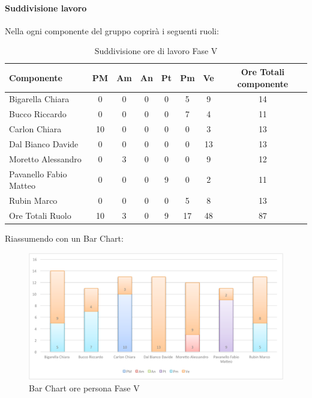 			\paragraph{Suddivisione lavoro}
				Nella  ogni componente del gruppo \groupname{} coprirà i seguenti ruoli:
				\begin{table}[H]
					\begin{center}
						\begin{tabular}{| l | c | c | c | c | c | c | c |}
							\hline
							Componente 				& PM	& Am 	& An 	& Pt 		& Pm 	& Ve 	& Ore Totali componente \\ \hline
							
							Bigarella Chiara 			& 0		& 0		& 0		& 0		& 5 		& 9 		& 14 \\
							Bucco Riccardo 			& 0		& 0		& 0		& 0		& 7		& 4 		& 11 \\
							Carlon Chiara	 			& 10 		& 0		& 0		& 0		& 0		& 3 		& 13 \\
							Dal Bianco Davide 			& 0		& 0		& 0		& 0		& 0		& 13 		& 13 \\
							Moretto Alessandro 			& 0		& 3 		& 0		& 0		& 0		& 9 		& 12 \\
							Pavanello Fabio Matteo	 	& 0		& 0		& 0		& 9 		& 0		& 2 		& 11 \\
							Rubin Marco				& 0		& 0		& 0		& 0		& 5 		& 8 		& 13 \\ \hline \hline
							
							Ore Totali Ruolo 			& 10 		& 3 		& 0		& 9 		& 17 		& 48 		& 87\\ \hline
						\end{tabular}
					\end{center}
					\caption{Suddivisione ore di lavoro Fase V}
				\end{table}
				Riassumendo con un Bar Chart:
				\begin{figure}[H]\centering
					\includegraphics[width=\textwidth]{PianoDiProgetto/Pics/ChartOreFaseV.pdf}
					\caption{Bar Chart ore persona Fase V}
				\end{figure}
